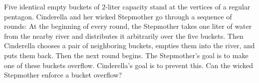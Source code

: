 Five identical empty buckets of $2$-liter capacity stand at the vertices of a regular pentagon. Cinderella and her wicked Stepmother go through a sequence of rounds: At the beginning of every round, the Stepmother takes one liter of water from the nearby river and distributes it arbitrarily over the five buckets. Then Cinderella chooses a pair of neighboring buckets, empties them into the river, and puts them back. Then the next round begins. The Stepmother's goal is to make one of these buckets overflow. Cinderella's goal is to prevent this. Can the wicked Stepmother enforce a bucket overflow?

